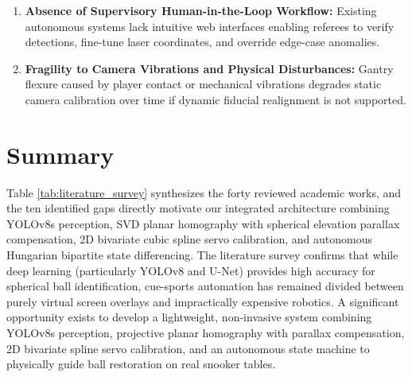 \begin{enumerate}
    \item \textbf{Absence of Supervisory Human-in-the-Loop Workflow:} Existing autonomous systems lack intuitive web interfaces enabling referees to verify detections, fine-tune laser coordinates, and override edge-case anomalies.
    \item \textbf{Fragility to Camera Vibrations and Physical Disturbances:} Gantry flexure caused by player contact or mechanical vibrations degrades static camera calibration over time if dynamic fiducial realignment is not supported.
\end{enumerate}

\section{Summary}
Table \ref{tab:literature_survey} synthesizes the forty reviewed academic works, and the ten identified gaps directly motivate our integrated architecture combining YOLOv8s perception, SVD planar homography with spherical elevation parallax compensation, 2D bivariate cubic spline servo calibration, and autonomous Hungarian bipartite state differencing.
The literature survey confirms that while deep learning (particularly YOLOv8 and U-Net) provides high accuracy for spherical ball identification, cue-sports automation has remained divided between purely virtual screen overlays and impractically expensive robotics. A significant opportunity exists to develop a lightweight, non-invasive system combining YOLOv8s perception, projective planar homography with parallax compensation, 2D bivariate spline servo calibration, and an autonomous state machine to physically guide ball restoration on real snooker tables.
